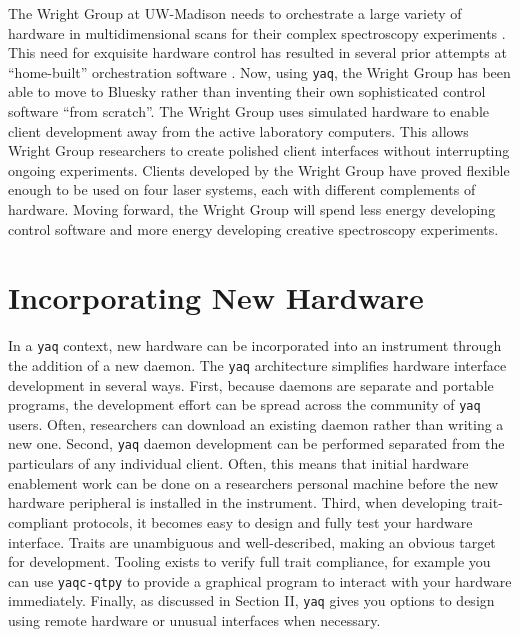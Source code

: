 \documentclass[aip, amsmath, amssymb, reprint,]{revtex4-2}
\newcommand\yaq{\texttt{yaq}}
\begin{document}
The Wright Group at UW-Madison needs to orchestrate a large variety of hardware in multidimensional scans for their complex spectroscopy experiments \cite{MukamelShaul2000a, WrightJohnCurtis2011a}.
This need for exquisite hardware control has resulted in several prior attempts at ``home-built'' orchestration software \cite{CarlsonRogerJohn1988a, MeyerKentAlbert2004b, KainSchuyler2017a, ThompsonBlaiseJonathan2018a, SundenKyle2022}.
Now, using \yaq{}, the Wright Group has been able to move to Bluesky rather than inventing their own sophisticated control software ``from scratch''.
The Wright Group uses simulated hardware to enable client development away from the active laboratory computers.
This allows Wright Group researchers to create polished client interfaces without interrupting  ongoing experiments.
Clients developed by the Wright Group have proved flexible enough to be used on four laser systems, each with different complements of hardware.
Moving forward, the Wright Group will spend less energy developing control software and more energy developing creative spectroscopy experiments.

\section{Incorporating New Hardware}

In a \yaq{} context, new hardware can be incorporated into an instrument through the addition of a new daemon.
The \yaq{} architecture simplifies hardware interface development in several ways.
First, because daemons are separate and portable programs, the development effort can be spread across the community of \yaq{} users.
Often, researchers can download an existing daemon rather than writing a new one.
Second, \yaq{} daemon development can be performed separated from the particulars of any individual client.
Often, this means that initial hardware enablement work can be done on a researchers personal machine before the new hardware peripheral is installed in the instrument.
Third, when developing trait-compliant protocols, it becomes easy to design and fully test your hardware interface.
Traits are unambiguous and well-described, making an obvious target for development.
Tooling exists to verify full trait compliance, for example you can use \texttt{yaqc-qtpy} to provide a graphical program to interact with your hardware immediately.
Finally, as discussed in Section II, \yaq{} gives you options to design using remote hardware or unusual interfaces when necessary.
\end{document}
